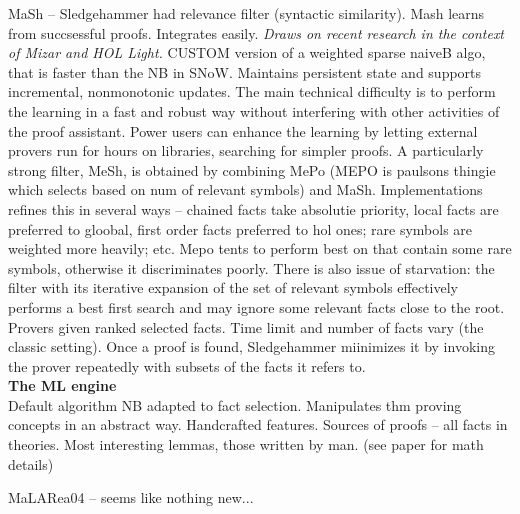 \documentclass{article}
\begin{document}
MaSh \cite{MaSh} -- Sledgehammer had relevance filter (syntactic similarity).
Mash learns from succsessful proofs. Integrates easily. \emph{Draws on recent
research in the context of Mizar and HOL Light.} CUSTOM version of a weighted
sparse naiveB algo, that is faster than the NB in SNoW. Maintains persistent
state and supports incremental, nonmonotonic updates.  The main technical
difficulty is to perform the learning in a fast and robust way without
interfering with other activities of the proof assistant. Power users can
enhance the learning by letting external provers run for hours on libraries,
searching for simpler proofs. A particularly strong filter, MeSh, is obtained
by combining MePo (MEPO is paulsons thingie which selects based on num of
relevant symbols) and MaSh. Implementations refines this in several ways --
chained facts take absolutie priority, local facts are preferred to gloobal,
first order facts preferred to hol ones; rare symbols are weighted more
heavily; etc. Mepo tents to perform best on that contain some rare symbols,
otherwise it discriminates poorly. There is also issue of starvation: the
filter with its iterative expansion of the set of relevant symbols effectively
performs a best first search and may ignore some relevant facts close to the
root. Provers given ranked selected facts. Time limit and number of facts vary
(the classic setting). Once a proof is found, Sledgehammer miinimizes it by
invoking the prover repeatedly with subsets of the facts it refers to. 
\\\textbf{The ML engine}\\
Default algorithm NB adapted to fact selection. Manipulates thm proving
concepts in an abstract way. Handcrafted features. Sources of proofs -- all
facts in theories. Most interesting lemmas, those written by man. (see paper
for math details)

MaLARea04 \cite{MaLARea04} -- seems like nothing new...
\end{document}
